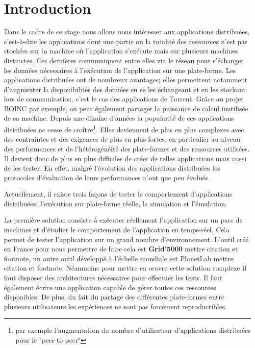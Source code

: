 \section{Introduction}



Dans le cadre de ce stage nous allons nous intéresser aux applications distribuées, c'est-à-dire les applications dont une partie ou la totalité des ressources  n'est pas stockées sur la machine où l'application s'exécute mais sur plusieurs machines distinctes. Ces dernières communiquent entre elles via le réseau pour s'échanger les données nécessaires à l'exécution de l'application sur une plate-forme. Les applications distribuées ont de nombreux avantages; elles permettent notamment d'augmenter la disponibilités des données en se les échangeant et en les stockant lors de communication, c'est le cas des applications de Torrent. Grâce au projet BOINC par exemple, on peut également partager la puissance de calcul inutilisée de sa machine. Depuis une dizaine d'années la popularité de ces applications distribuées ne cesse de croître\footnote{par exemple l'augmentation du nombre d'utilisateur d'applications distribuées pour le "peer-to-peer"}. Elles deviennent de plus en plus complexes avec des contraintes et des exigences de plus en plus fortes, en particulier au niveau des performances et de l'hétérogénéité des plate-formes et des ressources utilisées. Il devient donc de plus en plus difficiles de créer de telles applications mais aussi de les tester. En effet, malgré l'évolution des applications distribuées les protocoles d'évaluation de leurs performances n'ont que peu évolués.

Actuellement, il existe trois façons de tester le comportement d'applications distribuées; l'exécution sur plate-forme réelle, la simulation et l'émulation. 

La première solution consiste à exécuter réellement l'application sur un parc de machines et d'étudier le comportement de l'application en temps-réel. Cela permet de tester l'application sur un grand nombre d'environnement. L'outil créé en France pour nous permettre de faire cela est \textbf{Grid'5000} {\color{red}mettre citation et footnote}, un autre outil développé à l'échelle mondiale est PlanetLab {\color{red}mettre citation et footnote}. Néanmoins pour mettre en \oe uvre cette solution complexe il faut disposer des architectures nécessaires pour effectuer les tests. Il faut également écrire une application capable de gérer toutes ces ressources disponibles. De plus, du fait du partage des différentes plate-formes entre plusieurs utilisateurs les expériences ne sont pas forcément reproductibles. 

